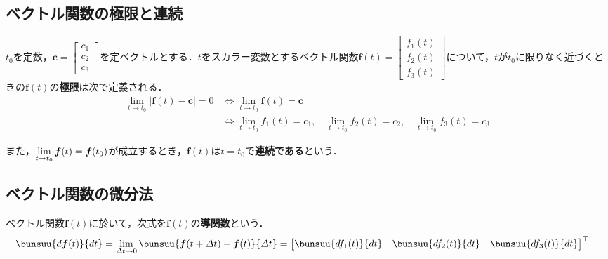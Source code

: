 \subsection{ベクトル関数の極限と連続}

$t_0$を定数，$\bm{c} = 
\begin{bmatrix}
	c_1\\ c_2\\ c_3
\end{bmatrix}
$を定ベクトルとする．$t$をスカラー変数とするベクトル関数$\bm{f}(t) = 
\begin{bmatrix}
	f_1(t)\\ f_2(t)\\ f_3(t)
\end{bmatrix}
$について，$t$が$t_0$に限りなく近づくときの$\bm{f}(t)$の\textbf{極限}は次で定義される．
\begin{align}
	\lim_{t \to t_0} |\bm{f}(t) - \bm{c}| = 0 &\iff \lim_{t \to t_0} \bm{f}(t) = \bm{c}\\
	&\iff \lim_{t \to t_0} f_1(t) = c_1,\quad \lim_{t \to t_0} f_2(t) = c_2,\quad \lim_{t \to t_0} f_3(t) = c_3
\end{align}

また，$\lim\limits_{t \to t_0} \bm{f}(t) = \bm{f}(t_0)$が成立するとき，$\bm{f}(t)$は$t = t_0$で\textbf{連続である}という．



\subsection{ベクトル関数の微分法}

ベクトル関数$\bm{f}(t)$に於いて，次式を$\bm{f}(t)$の\textbf{導関数}という．
\begin{align}
	\bunsuu{d\bm{f}(t)}{dt} &= \lim_{\varDelta t \to 0} \bunsuu{\bm{f}(t + \varDelta t) - \bm{f}(t)}{\varDelta t} =
	{
	\begin{bmatrix}
		\bunsuu{df_1(t)}{dt} &
		\bunsuu{df_2(t)}{dt} &
		\bunsuu{df_3(t)}{dt}
	\end{bmatrix}
	}^\top
\end{align}


